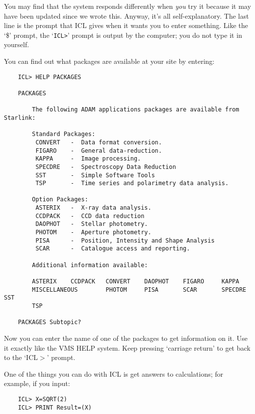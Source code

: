You may find that the system responds differently when {\em you} try it
because it may have been updated since we wrote this.
Anyway, it's all self-explanatory.
The last line is the prompt that ICL gives when it wants you to enter something.
Like the `\$' prompt, the `\verb+ICL>+' prompt is output by the computer; you do
not type it in yourself.

You can find out what packages are available at your site by entering:

\begin{small}
\begin{verbatim}
    ICL> HELP PACKAGES

    PACKAGES

        The following ADAM applications packages are available from Starlink:

        Standard Packages:
         CONVERT   -  Data format conversion.
         FIGARO    -  General data-reduction.
         KAPPA     -  Image processing.
         SPECDRE   -  Spectroscopy Data Reduction
         SST       -  Simple Software Tools
         TSP       -  Time series and polarimetry data analysis.

        Option Packages:
         ASTERIX   -  X-ray data analysis.
         CCDPACK   -  CCD data reduction
         DAOPHOT   -  Stellar photometry.
         PHOTOM    -  Aperture photometry.
         PISA      -  Position, Intensity and Shape Analysis
         SCAR      -  Catalogue access and reporting.

        Additional information available:

        ASTERIX    CCDPACK   CONVERT    DAOPHOT    FIGARO     KAPPA
        MISCELLANEOUS        PHOTOM     PISA       SCAR       SPECDRE   SST
        TSP

    PACKAGES Subtopic?
\end{verbatim}
\end{small}

Now you can enter the name of one of the packages to get information on it.
Use it exactly like the VMS HELP system.
Keep pressing `carriage return' to get back to the `ICL$>$' prompt.

One of the things you can do with ICL is get answers to calculations; for
example, if you input:

\begin{small}
\begin{verbatim}
    ICL> X=SQRT(2)
    ICL> PRINT Result=(X)
\end{verbatim}
\end{small}

